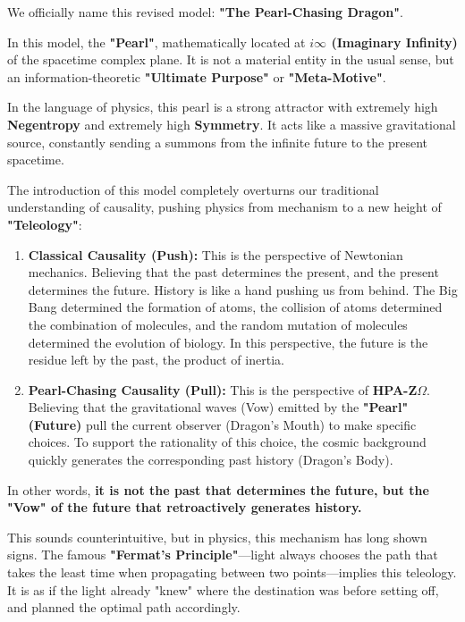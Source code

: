 We officially name this revised model: \textbf{"The Pearl-Chasing Dragon"}.

In this model, the \textbf{"Pearl"}, mathematically located at \textbf{$i\infty$ (Imaginary Infinity)} of the spacetime complex plane. It is not a material entity in the usual sense, but an information-theoretic \textbf{"Ultimate Purpose"} or \textbf{"Meta-Motive"}.

In the language of physics, this pearl is a strong attractor with extremely high \textbf{Negentropy} and extremely high \textbf{Symmetry}. It acts like a massive gravitational source, constantly sending a summons from the infinite future to the present spacetime.

The introduction of this model completely overturns our traditional understanding of causality, pushing physics from mechanism to a new height of \textbf{"Teleology"}:

\begin{enumerate}
\item \textbf{Classical Causality (Push):}
This is the perspective of Newtonian mechanics. Believing that the past determines the present, and the present determines the future. History is like a hand pushing us from behind. The Big Bang determined the formation of atoms, the collision of atoms determined the combination of molecules, and the random mutation of molecules determined the evolution of biology. In this perspective, the future is the residue left by the past, the product of inertia.

\item \textbf{Pearl-Chasing Causality (Pull):}
This is the perspective of \textbf{HPA-Z$\Omega$}. Believing that the gravitational waves (Vow) emitted by the \textbf{"Pearl" (Future)} pull the current observer (Dragon's Mouth) to make specific choices. To support the rationality of this choice, the cosmic background quickly generates the corresponding past history (Dragon's Body).
\end{enumerate}

In other words, \textbf{it is not the past that determines the future, but the "Vow" of the future that retroactively generates history.}

This sounds counterintuitive, but in physics, this mechanism has long shown signs. The famous \textbf{"Fermat's Principle"}—light always chooses the path that takes the least time when propagating between two points—implies this teleology. It is as if the light already "knew" where the destination was before setting off, and planned the optimal path accordingly.

